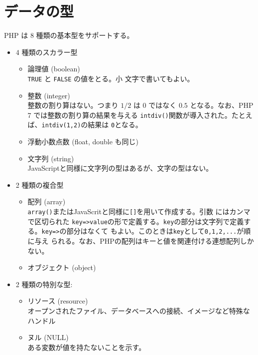 \section{データの型}
PHP は 8 種類の基本型をサポートする。
\begin{itemize}
 \item 4 種類のスカラー型
 \begin{itemize}
  \item 論理値 (boolean)\\\texttt{TRUE} と \texttt{FALSE} の値をとる。小
	文字で書いてもよい。
  \item 整数 (integer)\\整数の割り算はない。つまり $1/2$ は $0$ ではなく
	$0.5$ となる。{なお、PHP 7 では整数の割り算の結果を与える
        \Verb+intdiv()+関数が導入された。たとえば、\Verb+intdiv(1,2)+の結果は
        \Verb+0+となる。}
  \item 浮動小数点数 (float, double も同じ)
  \item 文字列 (string)\\
JavaScriptと同様に文字列の型はあるが、文字の型はない。
 \end{itemize}
 \item 2 種類の複合型
 \begin{itemize}
  \item 配列 (array)\\
\texttt{array()}またはJavaScritと同様に\texttt{[]}を用いて作成する。引数
        にはカンマで区切られた
	\texttt{key=>value}の形で定義する。\texttt{key}の部分は文字列で定義す
        る。\texttt{key=>}の部分はなくて
	もよい。このときは\texttt{key}として\texttt{0,1,2,...}が順に与え
	られる。なお、PHPの配列はキーと値を関連付ける連想配列しかない。
  \item オブジェクト (object)
 \end{itemize}
 \item 2 種類の特別な型:
\begin{itemize}
 \item リソース (resource)\\
オープンされたファイル、データベースへの接続、イメージなど特殊なハンドル
       
 \item ヌル (NULL)\\
ある変数が値を持たないことを示す。
\end{itemize}
\end{itemize}
